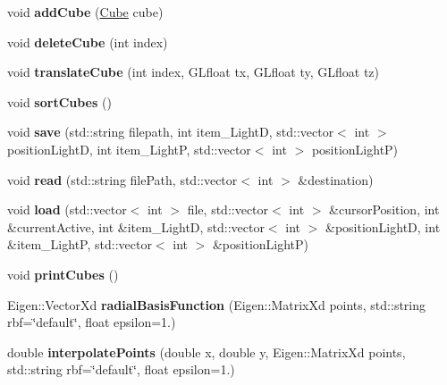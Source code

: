 \begin{DoxyCompactItemize}
\item 
\mbox{\label{classglimac_1_1CubeList_adaa2b032e1ee67cd7dc9feaab94edc6d}} 
void {\bfseries add\+Cube} (\hyperlink{classglimac_1_1Cube}{Cube} cube)
\item 
\mbox{\label{classglimac_1_1CubeList_ac8ffe918d3ff2788edd5c5bbfba45135}} 
void {\bfseries delete\+Cube} (int index)
\item 
\mbox{\label{classglimac_1_1CubeList_ace7f18a7aab16f50e724eab7d66d27b2}} 
void {\bfseries translate\+Cube} (int index, G\+Lfloat tx, G\+Lfloat ty, G\+Lfloat tz)
\item 
\mbox{\label{classglimac_1_1CubeList_af6615c0db1a97fcae5df6f27de71b6d8}} 
void {\bfseries sort\+Cubes} ()
\item 
\mbox{\label{classglimac_1_1CubeList_a9e7ac57439f018d89b71c6071efd48e6}} 
void {\bfseries save} (std\+::string filepath, int item\+\_\+\+LightD, std\+::vector$<$ int $>$ position\+LightD, int item\+\_\+\+LightP, std\+::vector$<$ int $>$ position\+LightP)
\item 
\mbox{\label{classglimac_1_1CubeList_a59d87cac2e218d617940ccdab5235b31}} 
void {\bfseries read} (std\+::string file\+Path, std\+::vector$<$ int $>$ \&destination)
\item 
\mbox{\label{classglimac_1_1CubeList_a6f615ea1238b29f8e19859b528ac6f26}} 
void {\bfseries load} (std\+::vector$<$ int $>$ file, std\+::vector$<$ int $>$ \&cursor\+Position, int \&current\+Active, int \&item\+\_\+\+LightD, std\+::vector$<$ int $>$ \&position\+LightD, int \&item\+\_\+\+LightP, std\+::vector$<$ int $>$ \&position\+LightP)
\item 
\mbox{\label{classglimac_1_1CubeList_a5c3e997708642903eb6b4c806de0cdf9}} 
void {\bfseries print\+Cubes} ()
\item 
\mbox{\label{classglimac_1_1CubeList_a538bbaae516f90563e233ef4b183c772}} 
Eigen\+::\+Vector\+Xd {\bfseries radial\+Basis\+Function} (Eigen\+::\+Matrix\+Xd points, std\+::string rbf=\char`\"{}default\char`\"{}, float epsilon=1.)
\item 
\mbox{\label{classglimac_1_1CubeList_ac4b12134064f67c17192b9c81796792e}} 
double {\bfseries interpolate\+Points} (double x, double y, Eigen\+::\+Matrix\+Xd points, std\+::string rbf=\char`\"{}default\char`\"{}, float epsilon=1.)
\end{DoxyCompactItemize}
